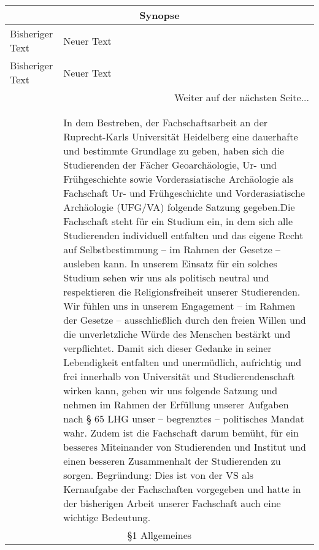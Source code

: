     {\begin{longtable}{|p{7.5cm}|p{7.5cm}|}
        \hline
        \multicolumn{2}{|c|}{Synopse}\\\hline
        Bisheriger Text & Neuer Text \\\hline
        \endfirsthead
        \hline
        Bisheriger Text & Neuer Text \\
        \hline
        \endhead
        \hline
        \multicolumn{2}{|r|}{Weiter auf der nächsten Seite...}\\
        \hline
        \endfoot
        \hline
        \multicolumn{2}{c}{Ende der Synopse} \\
        \endlastfoot
        \multicolumn{2}{|c|}{Präambel}\\\hline
        & 
        In dem Bestreben, der Fachschaftsarbeit an der Ruprecht-Karls Universität Heidelberg
        eine dauerhafte und bestimmte Grundlage zu geben, haben sich die Studierenden der
        Fächer Geoarchäologie, Ur- und Frühgeschichte sowie Vorderasiatische Archäologie als
        Fachschaft Ur- und Frühgeschichte und Vorderasiatische Archäologie (UFG/VA) folgende
        Satzung gegeben.\newline Die Fachschaft steht für ein Studium ein, in dem sich alle Studierenden individuell
        entfalten und das eigene Recht auf Selbstbestimmung – im Rahmen der Gesetze –
        ausleben kann. In unserem Einsatz für ein solches Studium sehen wir uns als politisch
        neutral und respektieren die Religionsfreiheit unserer Studierenden. Wir fühlen uns
        in unserem Engagement – im Rahmen der Gesetze – ausschließlich durch den freien
        Willen und die unverletzliche Würde des Menschen bestärkt und verpflichtet. Damit
        sich dieser Gedanke in seiner Lebendigkeit entfalten und unermüdlich, aufrichtig und
        frei innerhalb von Universität und Studierendenschaft wirken kann, geben wir uns
        folgende Satzung und nehmen im Rahmen der Erfüllung unserer Aufgaben nach § 65 LHG
        unser – begrenztes – politisches Mandat wahr. Zudem ist die Fachschaft darum bemüht,
        für ein besseres Miteinander von Studierenden und Institut und einen besseren
        Zusammenhalt der Studierenden zu sorgen. Begründung: Dies ist von der VS als
        Kernaufgabe der Fachschaften vorgegeben und hatte in der bisherigen Arbeit unserer
        Fachschaft auch eine wichtige Bedeutung.
        \\
        \multicolumn{2}{|c|}{§1 Allgemeines}\\\hline

\end{longtable}}
